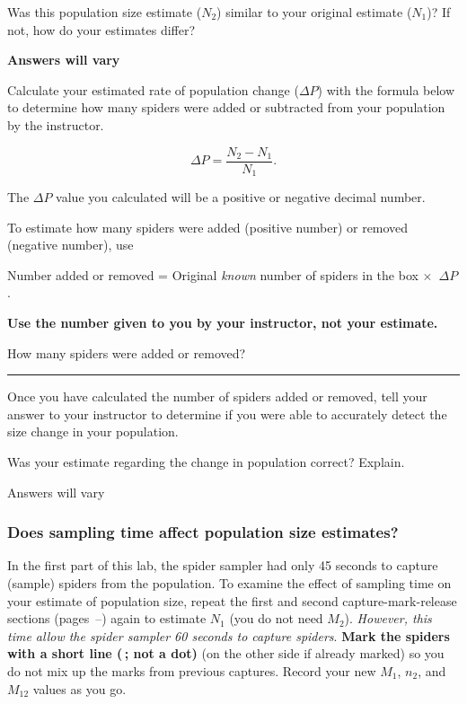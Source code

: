 \documentclass[12pt, hidelinks]{exam}
\newcommand*\AnswerBox[2]{%
    \parbox[t][#1]{0.92\textwidth}{%
    \begin{solution}#2\end{solution}}
    \vspace{\stretch{1}}
}
\begin{document}
\begin{questions}
\question
Was this population size estimate ($N_2$) similar to your original
estimate ($N_1$)? If not, how do your estimates differ?

\ifprintanswers \textbf{Answers will vary} \fi \vspace*{3\baselineskip}

\question
Calculate your estimated rate of population change ($\Delta P$) with the formula below to determine
how many spiders were added or subtracted from your population by the
instructor. 

\[ \Delta P = \dfrac{N_2 - N_1}{N_1}. \]

The $\Delta P$ value you calculated will be a positive or negative decimal number. 


\question
To estimate how many spiders were added (positive number) or removed (negative number), use

Number added or removed = Original \emph{known} number of spiders in the box $\times$~$\Delta P$.

\textbf{Use the number given to you by your instructor, not your estimate.}\bigskip


\question \label{ques:spider_change}
How many spiders were added or removed? \rule{0.75in}{0.4pt}


Once you have calculated the number of spiders added or removed, tell your answer to your
instructor to determine if you were able to accurately detect the size change
in your population.

\question
Was your estimate regarding the change in population correct? Explain.

\AnswerBox{1\baselineskip}{Answers will vary}


\subsubsection*{Does sampling time affect population size estimates?}

In the first part of this lab, the spider sampler had only 45 seconds to
capture (sample) spiders from the population. To examine the effect of
sampling time on your estimate of population size, repeat the first and second 
capture-mark-release sections (pages~\pageref{sec:first_mark}–\pageref{sec:second_mark}) 
again to estimate $N_1$ (you do not need $M_{2}$).
\emph{However, this time allow the spider sampler 60 seconds to capture
spiders}. \textbf{Mark the spiders with a short line (\raisebox{2pt}{\rule{4mm}{1.5pt}}\,; not a dot)} (on the other side if already marked) so you do not mix up the marks from previous captures. Record your new $M_1$, $n_2$, and $M_{12}$ values as you go. \bigskip


\end{questions}
\end{document}
